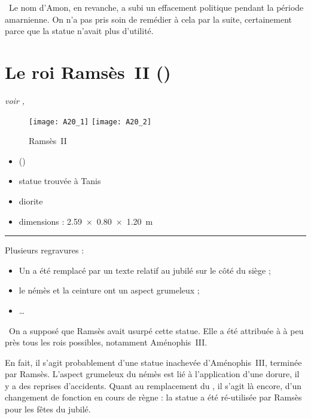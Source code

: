 \documentclass[dvipsnames,a4paper,twoside,10pt,openany,article]{memoir}
\newcommand{\separation}{%
  {\noi\hspace*{\fill}\rule{.33\textwidth}{1pt}\hspace*{\fill}}%
}
\begin{document}
\quad\donc~Le nom d'Amon, en revanche, a subi un effacement 
politique pendant la période amarnienne. On n'a pas pris soin de 
remédier à cela par la suite, certainement parce que la statue n'avait 
plus d'utilité.


\chapter{Le roi Ramsès~II ()}
\label{sec:A20}

\puceb{} \emph{voir , }
\bigskip

\begin{figure}[!h]
  \texttt{[image: A20\_1]}%
  \qquad%
  \texttt{[image: A20\_2]}%
  \caption{Ramsès~II }
  \label{fig:A20}
\end{figure}

\begin{itemize}
  \item {} ()
  \item statue trouvée à Tanis
  \item diorite
  \item dimensions : \SI{2.59x0.80x1.20}{\m}
\end{itemize}

\separation

Plusieurs regravures :
\begin{itemize}
  \item Un  a été remplacé par un texte relatif 
        au jubilé sur le côté du siège ;
  \item le némès et la ceinture ont un aspect \og grumeleux \fg{};
  \item \dots
\end{itemize}

\quad\donc~On a supposé que Ramsès avait usurpé cette statue. 
Elle a été attribuée à à peu près tous les rois possibles, notamment 
Aménophis~III.

En fait, il s'agit probablement d'une statue inachevée 
d'Aménophis~III, terminée par Ramsès. L'aspect grumeleux du némès est 
lié à l'application d'une dorure, il y a des reprises d'accidents. 
Quant au remplacement du , il s'agit là encore, 
d'un changement de fonction en cours de règne  : la statue a 
été ré-utilisée par Ramsès pour les fêtes du jubilé.
\end{document}
